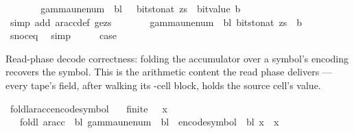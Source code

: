 \begin{isabellebody}
\ \ \isamarkupfalse%
\ \isamarkupfalse%
\ {\isachardoublequoteopen}{\isasymdots}\ {\isacharequal}{\kern0pt}\ gamma{\isacharunderscore}{\kern0pt}unenum\ {\isasymGamma}\ bl\ {\isacharparenleft}{\kern0pt}{}\ {\isacharasterisk}{\kern0pt}\ bits{\isacharunderscore}{\kern0pt}to{\isacharunderscore}{\kern0pt}nat\ zs\ {\isacharplus}{\kern0pt}\ bit{\isacharunderscore}{\kern0pt}value\ b{\isacharparenright}{\kern0pt}{\isachardoublequoteclose}\isanewline
\ \ \ \ \isamarkupfalse%
\ {\isacharparenleft}{\kern0pt}simp\ add{\isacharcolon}{\kern0pt}\ ar{\isacharunderscore}{\kern0pt}acc{\isacharunderscore}{\kern0pt}def\ ge{\isacharunderscore}{\kern0pt}zs{\isacharparenright}{\kern0pt}\isanewline
\ \ \isamarkupfalse%
\ \isamarkupfalse%
\ {\isachardoublequoteopen}{\isasymdots}\ {\isacharequal}{\kern0pt}\ gamma{\isacharunderscore}{\kern0pt}unenum\ {\isasymGamma}\ bl\ {\isacharparenleft}{\kern0pt}bits{\isacharunderscore}{\kern0pt}to{\isacharunderscore}{\kern0pt}nat\ {\isacharparenleft}{\kern0pt}zs\ {\isacharat}{\kern0pt}\ {\isacharbrackleft}{\kern0pt}b{\isacharbrackright}{\kern0pt}{\isacharparenright}{\kern0pt}{\isacharparenright}{\kern0pt}{\isachardoublequoteclose}\isanewline
\ \ \ \ \isamarkupfalse%
\ snoc{\isacharunderscore}{\kern0pt}eq\ \isamarkupfalse%
\ simp\isanewline
\ \ \isamarkupfalse%
\ \isamarkupfalse%
\ {\isacharquery}{\kern0pt}case\ \isakeywordONE{{\isachardot}{\kern0pt}}\isamarkupfalse%
\isanewline
{}\isamarkupfalse%
%
\endisatagproof
{\isafoldproof}%
%
\isadelimproof
%
\endisadelimproof
%
\begin{isamarkuptext}%
Read-phase decode correctness: folding the accumulator over
  a symbol's encoding recovers the symbol.  This is the arithmetic
  content the read phase delivers — every tape's  field,
  after walking its -cell block, holds the source cell's
  value.%
\end{isamarkuptext}\isamarkuptrue%
\isamarkupfalse%
\ foldl{\isacharunderscore}{\kern0pt}ar{\isacharunderscore}{\kern0pt}acc{\isacharunderscore}{\kern0pt}encode{\isacharunderscore}{\kern0pt}symbol{\isacharcolon}{\kern0pt}\isanewline
\ \ \ {\isachardoublequoteopen}finite\ {\isasymGamma}{\isachardoublequoteclose}\ \ {\isachardoublequoteopen}x\ {\isasymin}\ {\isasymGamma}{\isachardoublequoteclose}\isanewline
\ \ \ {\isachardoublequoteopen}foldl\ {\isacharparenleft}{\kern0pt}ar{\isacharunderscore}{\kern0pt}acc\ {\isasymGamma}\ bl{\isacharparenright}{\kern0pt}\ {\isacharparenleft}{\kern0pt}gamma{\isacharunderscore}{\kern0pt}unenum\ {\isasymGamma}\ bl\ {}{\isacharparenright}{\kern0pt}\ {\isacharparenleft}{\kern0pt}encode{\isacharunderscore}{\kern0pt}symbol\ {\isasymGamma}\ bl\ x{\isacharparenright}{\kern0pt}\ {\isacharequal}{\kern0pt}\ x{\isachardoublequoteclose}\isanewline

\end{isabellebody}

